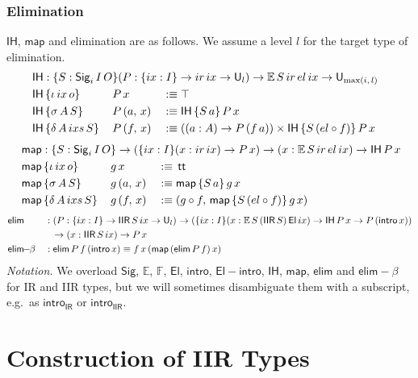 \documentclass[acmsmall,screen,review]{acmart}
\newcommand{\msf}[1]{{\mathsf{#1}}}
\newcommand{\mbb}[1]{\mathbb{#1}}
\newcommand{\U}{\msf{U}}
\newcommand{\El}{\msf{El}}
\newcommand{\Sig}{\msf{Sig}}
\newcommand{\ttt}{\msf{tt}}
\newcommand{\ir}{{ir}}
\newcommand{\el}{{el}}
\newcommand{\ix}{{ix}}
\newcommand{\ixs}{{ixs}}
\newcommand{\IR}{\msf{IR}}
\newcommand{\intro}{\msf{intro}}
\newcommand{\IH}{\msf{IH}}
\newcommand{\map}{\msf{map}}
\newcommand{\elim}{\msf{elim}}
\newcommand{\IIR}{\msf{IIR}}
\newcommand{\Elintro}{\msf{El\!\!-\!\!intro}}
\newcommand{\E}{\mbb{E}}
\newcommand{\F}{\mbb{F}}
\begin{document}
\subsubsection{Elimination}\label{sec:iir-elimination} $\IH$, $\map$ and elimination are
as follows. We assume a level $l$ for the target type of elimination.
\begin{alignat*}{3}
  &\rlap{$\IH : \{S : \Sig_i\,I\,O\}(P : \{\ix : I\}\to \ir\,\ix \to \U_l) \to \E\,S\,\ir\,\el\,\ix \to \U_{\max(i,\,l)}$} \\
  &\IH\,\{\iota\,\ix\,o      \}\,&&P\,x       &&:\equiv \top \\
  &\IH\,\{\sigma\,A\,S     \}\,&&P\,(a,\,x) &&:\equiv \IH\,\{S\,a\}\,P\,x \\
  &\IH\,\{\delta\,A\,\ixs\,S\}\,&&P\,(f,\,x) &&:\equiv ((a : A) \to P\,(f\,a)) \times \IH\,\{S\,(\el \circ f)\}\,P\,x
\end{alignat*}
\begin{alignat*}{3}
  &\hspace{-7em}\rlap{$\map : \{S : \Sig_i\,I\,O\} \to (\{\ix : I\}(x : \ir\,\ix) \to P\,x) \to (x : \E\,S\,\ir\,\el\,\ix) \to \IH\,P\,x$} \\
  &\hspace{-7em}\map\,\{\iota\,\ix\,o\}\,&&g\,x       &&:\equiv\,\ttt \\
  &\hspace{-7em}\map\,\{\sigma\,A\,S\}\,&&g\,(a,\,x) &&:\equiv \map\,\{S\,a\}\,g\,x \\
  &\hspace{-7em}\map\,\{\delta\,A\,\ixs\,S\}\,&&g\,(f,\,x) &&:\equiv (g \circ f,\,\map\,\{S\,(\el \circ f)\}\,g\,x)
\end{alignat*}
\begin{alignat*}{3}
  &\elim           &&: (P : \{\ix : I\}\to \IIR\,S\,\ix \to \U_l) \to (\{\ix : I\}(x : \E\,S\,(\IIR\,S)\,\El\,\ix) \to \IH\,P\,x \to P\,(\intro\,x))\\
  &                && \hspace{0.7em}\to (x : \IIR\,S\,\ix) \to P\,x \\
  &\elim\!\!-\!\!\beta &&: \elim\,P\,f\,(\intro\,x) \equiv f\,x\,(\map\,(\elim\,P\,f)\,x)
\end{alignat*}
\emph{Notation.} We overload $\Sig$, $\E$, $\F$, $\El$, $\intro$, $\Elintro$, $\IH$, $\map$, $\elim$
and $\elim\!\!-\!\!\beta$ for IR and IIR types, but we will sometimes disambiguate them with a
subscript, e.g.\ as $\intro_\IR$ or $\intro_\IIR$.

\section{Construction of IIR Types}\label{sec:iir-construction}
\end{document}
